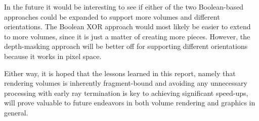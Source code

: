 \documentclass{report}
\begin{document}
In the future it would be interesting to see if either of the two Boolean-based
approaches could be expanded to support more volumes and different orientations.
The Boolean XOR approach would most likely be easier to extend to more volumes,
since it is just a matter of creating more pieces.  However, the depth-masking
approach will be better off for supporting different orientations because it
works in pixel space.

Either way, it is hoped that the lessons learned in this report, namely that
rendering volumes is inherently fragment-bound and avoiding any unnecessary
processing with early ray termination is key to achieving significant speed-ups,
will prove valuable to future endeavors in both volume rendering and graphics in
general.


\newpage


\end{document}
